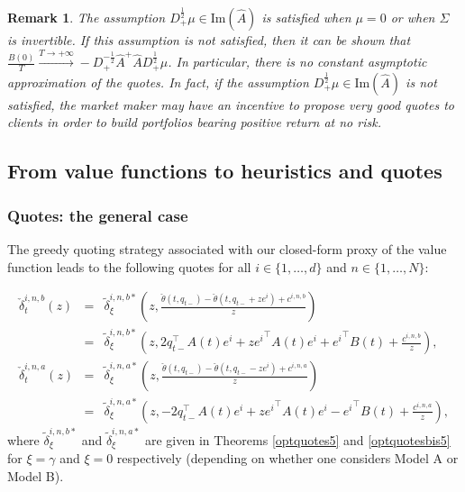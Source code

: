 \documentclass[preprint, 3p]{elsarticle}
\newcommand{\1}{{\chi}}
\newtheorem{remark}{Remark}
\begin{document}
\begin{remark}
  The assumption $D_+^{\frac 12} \mu \in \text{Im}(\widehat A)$ is satisfied when $\mu = 0$ or when $\Sigma$ is invertible. If this assumption is not satisfied, then it can be shown that $\frac{B(0)}{T} \stackrel{T\to+\infty}{\longrightarrow} - D_+^{-\frac 12} \widehat{A}^+ \widehat{A} D_+^{\frac 12} \mu$. In particular, there is no constant asymptotic approximation of the quotes. In fact, if the assumption $D_+^{\frac 12} \mu \in \text{Im}(\widehat A)$ is not satisfied, the market maker may have an incentive to propose very good quotes to clients in order to build portfolios bearing positive return at no risk.\\
\end{remark}


\subsection{From value functions to heuristics and quotes}
\vspace{3mm}
\subsubsection{Quotes: the general case}
\vspace{3mm}
The greedy quoting strategy associated with our closed-form proxy of the value function leads to the following quotes for all $i \in \{1, \ldots, d\}$ and $n \in \{1,\ldots, N\}$:

\begin{eqnarray*}
	\check\delta^{i,n,b}_t(z) &=& \tilde{\delta}^{i,n,b*}_\xi\left(z,\frac{\check\theta(t,q_{t-}) - \check\theta(t,q_{t-}+z e^i) + c^{i,n,b}}{z}\right)\\
 &=& \tilde{\delta}^{i,n,b*}_\xi\left(z,2q_{t-}^\intercal A(t) e^i + z {e^i}^\intercal A(t) e^i + {e^i}^\intercal B(t) + \frac{c^{i,n,b}}{z} \right),\\
	\check\delta^{i,n,a}_t(z) &=& \tilde{\delta}^{i,n,a*}_\xi\left(z,\frac{\check\theta(t,q_{t-}) - \check\theta(t,q_{t-}-z e^i) + c^{i,n,a}}{z}\right)\\
&=& \tilde{\delta}^{i,n,a*}_\xi\left(z,-2q_{t-}^\intercal A(t) e^i + z {e^i}^\intercal A(t) e^i - {e^i}^\intercal B(t)  + \frac{c^{i,n,a}}{z} \right),
	\end{eqnarray*}
where $\tilde{\delta}^{i,n,b*}_\xi$ and $\tilde{\delta}^{i,n,a*}_\xi$ are given in Theorems \ref{optquotes5} and \ref{optquotesbis5} for $\xi = \gamma$ and $\xi = 0$ respectively (depending on whether one considers Model A or Model B).\\
\end{document}

